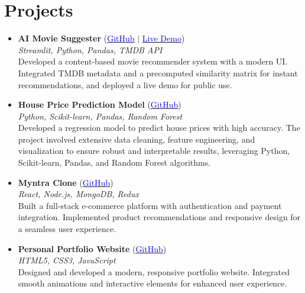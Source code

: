 \documentclass[11pt,a4paper]{article}
\begin{document}
\section*{Projects}
\begin{itemize}[leftmargin=*]
    \item \textbf{AI Movie Suggester} (\href{https://github.com/alokbhateshwar/ai-movie-suggester}{\textcolor{blue}{GitHub}} $\vert$ \href{https://ai-movie-suggester.streamlit.app/}{\textcolor{blue}{Live Demo}}) \\
    \textit{Streamlit, Python, Pandas, TMDB API} \\
    Developed a content-based movie recommender system with a modern UI. Integrated TMDB metadata and a precomputed similarity matrix for instant recommendations, and deployed a live demo for public use.
    \item \textbf{House Price Prediction Model} (\href{https://github.com/alokbhateshwar/house-price-prediction}{\textcolor{blue}{GitHub}}) \\
    \textit{Python, Scikit-learn, Pandas, Random Forest} \\
    Developed a regression model to predict house prices with high accuracy. The project involved extensive data cleaning, feature engineering, and visualization to ensure robust and interpretable results, leveraging Python, Scikit-learn, Pandas, and Random Forest algorithms.
    \item \textbf{Myntra Clone} (\href{https://github.com/alokbhateshwar/myntra-clone}{\textcolor{blue}{GitHub}}) \\
    \textit{React, Node.js, MongoDB, Redux} \\
    Built a full-stack e-commerce platform with authentication and payment integration. Implemented product recommendations and responsive design for a seamless user experience.
    \item \textbf{Personal Portfolio Website} (\href{https://github.com/alokbhateshwar/portfolio}{\textcolor{blue}{GitHub}}) \\
    \textit{HTML5, CSS3, JavaScript} \\
    Designed and developed a modern, responsive portfolio website. Integrated smooth animations and interactive elements for enhanced user experience.

\end{itemize}
\end{document}
